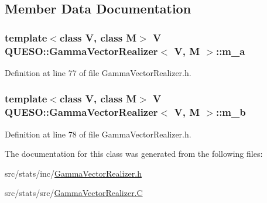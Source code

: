 \subsection{Member Data Documentation}
\hypertarget{class_q_u_e_s_o_1_1_gamma_vector_realizer_a536756e884d641240015451f2f7a759c}{
\subsubsection[{m\-\_\-a}]{\setlength{\rightskip}{0pt plus 5cm}template$<$class V, class M$>$ V {\bf Q\-U\-E\-S\-O\-::\-Gamma\-Vector\-Realizer}$<$ V, M $>$\-::m\-\_\-a\hspace{0.3cm}{\ttfamily [private]}}}\label{class_q_u_e_s_o_1_1_gamma_vector_realizer_a536756e884d641240015451f2f7a759c}


Definition at line 77 of file Gamma\-Vector\-Realizer.\-h.

\hypertarget{class_q_u_e_s_o_1_1_gamma_vector_realizer_a55e4d4fe511a6d63eaa98d6d6a7aaac5}{
\subsubsection[{m\-\_\-b}]{\setlength{\rightskip}{0pt plus 5cm}template$<$class V, class M$>$ V {\bf Q\-U\-E\-S\-O\-::\-Gamma\-Vector\-Realizer}$<$ V, M $>$\-::m\-\_\-b\hspace{0.3cm}{\ttfamily [private]}}}\label{class_q_u_e_s_o_1_1_gamma_vector_realizer_a55e4d4fe511a6d63eaa98d6d6a7aaac5}


Definition at line 78 of file Gamma\-Vector\-Realizer.\-h.



The documentation for this class was generated from the following files\-:\begin{DoxyCompactItemize}
\item 
src/stats/inc/\hyperlink{_gamma_vector_realizer_8h}{Gamma\-Vector\-Realizer.\-h}\item 
src/stats/src/\hyperlink{_gamma_vector_realizer_8_c}{Gamma\-Vector\-Realizer.\-C}\end{DoxyCompactItemize}
